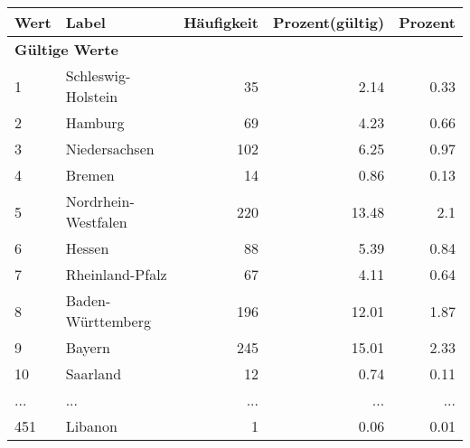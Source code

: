      \begin{longtable}{lXrrr}
     \toprule
     \textbf{Wert} & \textbf{Label} & \textbf{Häufigkeit} & \textbf{Prozent(gültig)} & \textbf{Prozent} \\
     \endhead
     \midrule
     \multicolumn{5}{l}{\textbf{Gültige Werte}}\\
        1 & \multicolumn{1}{X}{Schleswig-Holstein} & %
          \num{35} &
          \num[round-mode=places,round-precision=2]{2,14} &
          \num[round-mode=places,round-precision=2]{0,33} \\
        2 & \multicolumn{1}{X}{Hamburg} & %
          \num{69} &
          \num[round-mode=places,round-precision=2]{4,23} &
          \num[round-mode=places,round-precision=2]{0,66} \\
        3 & \multicolumn{1}{X}{Niedersachsen} & %
          \num{102} &
          \num[round-mode=places,round-precision=2]{6,25} &
          \num[round-mode=places,round-precision=2]{0,97} \\
        4 & \multicolumn{1}{X}{Bremen} & %
          \num{14} &
          \num[round-mode=places,round-precision=2]{0,86} &
          \num[round-mode=places,round-precision=2]{0,13} \\
        5 & \multicolumn{1}{X}{Nordrhein-Westfalen} & %
          \num{220} &
          \num[round-mode=places,round-precision=2]{13,48} &
          \num[round-mode=places,round-precision=2]{2,1} \\
        6 & \multicolumn{1}{X}{Hessen} & %
          \num{88} &
          \num[round-mode=places,round-precision=2]{5,39} &
          \num[round-mode=places,round-precision=2]{0,84} \\
        7 & \multicolumn{1}{X}{Rheinland-Pfalz} & %
          \num{67} &
          \num[round-mode=places,round-precision=2]{4,11} &
          \num[round-mode=places,round-precision=2]{0,64} \\
        8 & \multicolumn{1}{X}{Baden-Württemberg} & %
          \num{196} &
          \num[round-mode=places,round-precision=2]{12,01} &
          \num[round-mode=places,round-precision=2]{1,87} \\
        9 & \multicolumn{1}{X}{Bayern} & %
          \num{245} &
          \num[round-mode=places,round-precision=2]{15,01} &
          \num[round-mode=places,round-precision=2]{2,33} \\
        10 & \multicolumn{1}{X}{Saarland} & %
          \num{12} &
          \num[round-mode=places,round-precision=2]{0,74} &
          \num[round-mode=places,round-precision=2]{0,11} \\
       ... & ... & ... & ... & ... \\
        451 & \multicolumn{1}{X}{Libanon} & %
          \num{1} &
          \num[round-mode=places,round-precision=2]{0,06} &
          \num[round-mode=places,round-precision=2]{0,01} \\


\end{longtable}
